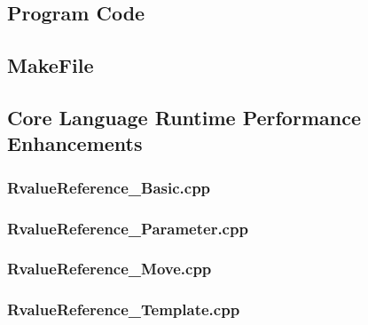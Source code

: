 \documentclass[11pt]{report}
\newcommand{\Cpp}{\lstset{language=C++,keywordstyle=\bfseries,breaklines,breakindent=30pt}}
\newcommand{\Make}{\lstset{language=make}}
\begin{document}

	


\begin{appendix}

\chapter{Program Code}
\label{chapter:Programcode}


\section{MakeFile}
\label{Makefile}

\Make

%


\section{Core Language Runtime Performance Enhancements}
\label{Appendix: corelanguage runtime performance}

\Cpp

\subsection{RvalueReference\_Basic.cpp}
\label{RvalueReference_Basic}


\subsection{RvalueReference\_Parameter.cpp}
\label{RvalueReference_Parameter}


\subsection{RvalueReference\_Move.cpp}
\label{RvalueReference_Move}


\subsection{RvalueReference\_Template.cpp}
\label{RvalueReference_Template}



\end{appendix}
\end{document}
